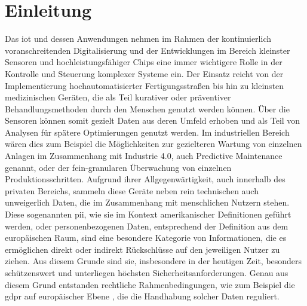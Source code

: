 
\section{Einleitung}
\label{sec:Einleitung}



Das \ac{iot} und dessen Anwendungen nehmen im Rahmen der kontinuierlich voranschreitenden Digitalisierung und der Entwicklungen im Bereich kleinster Sensoren und hochleistungsfähiger Chips eine immer wichtigere Rolle in der Kontrolle und Steuerung komplexer Systeme ein.
Der Einsatz reicht von der Implementierung hochautomatisierter Fertigungsstraßen bis hin zu kleinsten medizinischen Geräten, die als Teil kurativer oder präventiver Behandlungsmethoden durch den Menschen genutzt werden können. Über die Sensoren können somit gezielt Daten aus deren Umfeld erhoben und als Teil von Analysen für spätere Optimierungen genutzt werden. Im industriellen Bereich wären dies zum Beispiel die Möglichkeiten zur gezielteren Wartung von einzelnen Anlagen im Zusammenhang mit Industrie 4.0, auch Predictive Maintenance genannt, oder der fein-granularen Überwachung von einzelnen Produktionsschritten.
Aufgrund ihrer Allgegenwärtigkeit, auch innerhalb des privaten Bereichs, sammeln diese Geräte neben rein technischen auch unweigerlich Daten, die im Zusammenhang mit menschlichen Nutzern stehen. Diese sogenannten \ac{pii}, wie sie im Kontext amerikanischer Definitionen geführt werden, oder personenbezogenen Daten, entsprechend der Definition aus dem europäischen Raum, sind eine besondere Kategorie von Informationen, die es ermöglichen direkt oder indirekt Rückschlüsse auf den jeweiligen Nutzer zu ziehen. Aus diesem Grunde sind sie, insbesondere in der heutigen Zeit, besonders schützenswert und unterliegen höchsten Sicherheitsanforderungen.
Genau aus diesem Grund entstanden rechtliche Rahmenbedingungen, wie zum Beispiel die \ac{gdpr} auf europäischer Ebene \cite{dsgvo2016}, die die Handhabung solcher Daten reguliert.

